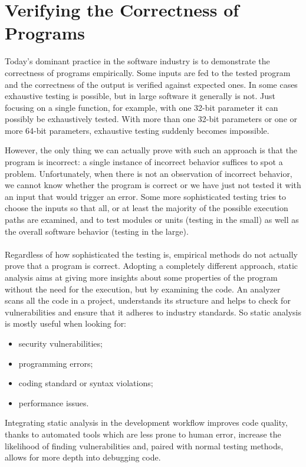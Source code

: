\chapter{Verifying the Correctness of Programs}\label{chapter:verifying-the-correctness-of-programs}
Today's dominant practice in the software industry is to demonstrate the correctness of programs empirically. Some inputs are fed to the tested program and the correctness of the output is verified against expected ones. In some cases exhaustive testing is possible, but in large software it generally is not. Just focusing on a single function, for example, with one 32-bit parameter it can possibly be exhaustively tested.  With more than one 32-bit parameters or one or more 64-bit parameters, exhaustive testing suddenly becomes impossible.

However, the only thing we can actually prove with such an approach is that the program is incorrect: a single instance of incorrect behavior suffices to spot a problem. Unfortunately, when there is not an observation of incorrect behavior, we cannot know whether the program is correct or we have just not tested it with an input that would trigger an error.
Some more sophisticated testing tries to choose the inputs so that all, or at least the majority of the possible execution paths are examined, and to test modules or units (testing in the small) as well as the overall software behavior (testing in the large). 
\\\\
Regardless of how sophisticated the testing is, empirical methods do not actually prove that a program is correct.
Adopting a completely different approach, static analysis aims at giving more insights about some properties of the program without the need for the execution, but by examining the code.
An analyzer scans all the code in a project, understands its structure and helps to check for vulnerabilities and ensure that it adheres to industry standards. 
So static analysis is mostly useful when looking for:
\begin{itemize}
  \item security vulnerabilities;
  \item programming errors;
  \item coding standard or syntax violations;
  \item performance issues.
\end{itemize}

Integrating static analysis in the development workflow improves code quality, thanks to automated tools which are less prone to human error, increase the likelihood of finding vulnerabilities and, paired with normal testing methods, allows for more depth into debugging code.

